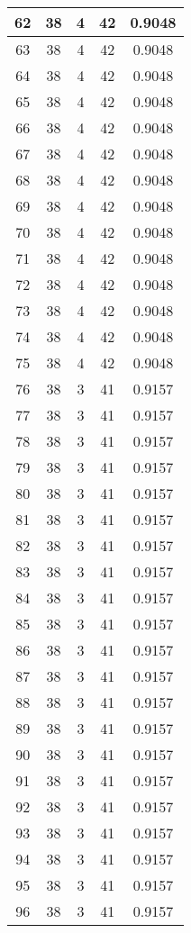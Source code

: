 \documentclass[letterpaper, 12pt]{article}
\begin{document}
\begin{longtable}{|c|c|c|c|c|}
\hline
62 & 38 & 4 & 42 & 0.9048 \\
\hline
63 & 38 & 4 & 42 & 0.9048 \\
\hline
64 & 38 & 4 & 42 & 0.9048 \\
\hline
65 & 38 & 4 & 42 & 0.9048 \\
\hline
66 & 38 & 4 & 42 & 0.9048 \\
\hline
67 & 38 & 4 & 42 & 0.9048 \\
\hline
68 & 38 & 4 & 42 & 0.9048 \\
\hline
69 & 38 & 4 & 42 & 0.9048 \\
\hline
70 & 38 & 4 & 42 & 0.9048 \\
\hline
71 & 38 & 4 & 42 & 0.9048 \\
\hline
72 & 38 & 4 & 42 & 0.9048 \\
\hline
73 & 38 & 4 & 42 & 0.9048 \\
\hline
74 & 38 & 4 & 42 & 0.9048 \\
\hline
75 & 38 & 4 & 42 & 0.9048 \\
\hline
76 & 38 & 3 & 41 & 0.9157 \\
\hline
77 & 38 & 3 & 41 & 0.9157 \\
\hline
78 & 38 & 3 & 41 & 0.9157 \\
\hline
79 & 38 & 3 & 41 & 0.9157 \\
\hline
80 & 38 & 3 & 41 & 0.9157 \\
\hline
81 & 38 & 3 & 41 & 0.9157 \\
\hline
82 & 38 & 3 & 41 & 0.9157 \\
\hline
83 & 38 & 3 & 41 & 0.9157 \\
\hline
84 & 38 & 3 & 41 & 0.9157 \\
\hline
85 & 38 & 3 & 41 & 0.9157 \\
\hline
86 & 38 & 3 & 41 & 0.9157 \\
\hline
87 & 38 & 3 & 41 & 0.9157 \\
\hline
88 & 38 & 3 & 41 & 0.9157 \\
\hline
89 & 38 & 3 & 41 & 0.9157 \\
\hline
90 & 38 & 3 & 41 & 0.9157 \\
\hline
91 & 38 & 3 & 41 & 0.9157 \\
\hline
92 & 38 & 3 & 41 & 0.9157 \\
\hline
93 & 38 & 3 & 41 & 0.9157 \\
\hline
94 & 38 & 3 & 41 & 0.9157 \\
\hline
95 & 38 & 3 & 41 & 0.9157 \\
\hline
96 & 38 & 3 & 41 & 0.9157 \\

\end{longtable}
\end{document}
